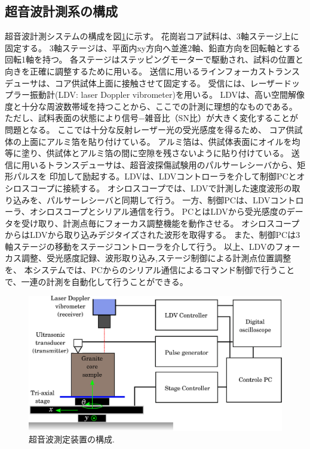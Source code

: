 \subsection{超音波計測系の構成}
超音波計測システムの構成を図\ref{fig:fig3}に示す。
花崗岩コア試料は、3軸ステージ上に固定する。
3軸ステージは、平面内xy方向へ並進2軸、鉛直方向を回転軸とする回転1軸を持つ。
各ステージはステッピングモーターで駆動され、試料の位置と向きを正確に調整するために用いる。
送信に用いるラインフォーカストランスデューサは、コア供試体上面に接触させて固定する。
受信には、レーザードップラー振動計(LDV: laser Doppler vibrometer)を用いる。
LDVは、高い空間解像度と十分な周波数帯域を持つことから、ここでの計測に理想的なものである。
ただし、試料表面の状態により信号−雑音比（SN比）が大きく変化することが問題となる。
ここでは十分な反射レーザー光の受光感度を得るため、
コア供試体の上面にアルミ箔を貼り付けている。
アルミ箔は、供試体表面にオイルを均等に塗り、供試体とアルミ箔の間に空隙を残さないように貼り付けている。
送信に用いるトランスデューサは、超音波探傷試験用のパルサーレシーバから、矩形パルスを
印加して励起する。LDVは、LDVコントローラを介して制御PCとオシロスコープに接続する。
オシロスコープでは、LDVで計測した速度波形の取り込みを、パルサーレシーバと同期して行う。
一方、制御PCは、LDVコントローラ、オシロスコープとシリアル通信を行う。
PCとはLDVから受光感度のデータを受け取り、計測点毎にフォーカス調整機能を動作させる。
オシロスコープからはLDVから取り込みデジタイズされた波形を取得する。
また、制御PCは3軸ステージの移動をステージコントローラを介して行う。
以上、LDVのフォーカス調整、受光感度記録、波形取り込み,ステージ制御による計測点位置調整を、
本システムでは、PCからのシリアル通信によるコマンド制御で行うことで、一連の計測を自動化して行うことができる。
\begin{figure}[h]
	\begin{center}
	\includegraphics[width=0.8\linewidth]{Figs/fig3.eps} 
	\end{center}
	\caption{
		超音波測定装置の構成.
	} 
	\label{fig:fig3}
\end{figure}
